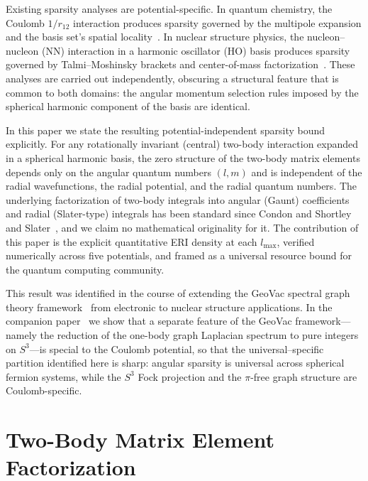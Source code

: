 \documentclass[twocolumn,pra,amsmath,amssymb,superscriptaddress]{revtex4-2}
\begin{document}
Existing sparsity analyses are potential-specific.  In quantum
chemistry, the Coulomb $1/r_{12}$ interaction produces sparsity
governed by the multipole expansion and the basis set's spatial
locality~\cite{Whitten1973, Dunlap2000}.  In nuclear structure
physics, the nucleon--nucleon (NN) interaction in a harmonic
oscillator (HO) basis produces sparsity governed by
Talmi--Moshinsky brackets and center-of-mass
factorization~\cite{Suhonen2007}.  These analyses are carried out
independently, obscuring a structural feature that is common to both
domains: the angular momentum selection rules imposed by the
spherical harmonic component of the basis are identical.

In this paper we state the resulting potential-independent sparsity
bound explicitly.  For any rotationally invariant (central) two-body
interaction expanded in a spherical harmonic basis, the zero
structure of the two-body matrix elements depends only on the
angular quantum numbers $(l, m)$ and is independent of the radial
wavefunctions, the radial potential, and the radial quantum numbers.
The underlying factorization of two-body integrals into angular
(Gaunt) coefficients and radial (Slater-type) integrals has been
standard since Condon and Shortley~\cite{CondonShortley1935} and
Slater~\cite{Slater1960}, and we claim no mathematical originality
for it.  The contribution of this paper is the explicit quantitative
ERI density at each $l_{\max}$, verified numerically across five
potentials, and framed as a universal resource bound for the quantum
computing community.

This result was identified in the course of extending the GeoVac
spectral graph theory framework~\cite{GeoVac_Paper7, GeoVac_Paper14}
from electronic to nuclear structure applications.  In the
companion paper~\cite{GeoVac_Paper23} we show that a separate
feature of the GeoVac framework---namely the reduction of the
one-body graph Laplacian spectrum to pure integers on $S^3$---is
special to the Coulomb potential, so that the universal--specific
partition identified here is sharp: angular sparsity is universal
across spherical fermion systems, while the $S^3$ Fock projection
and the $\pi$-free graph structure are Coulomb-specific.

\section{Two-Body Matrix Element Factorization}
\label{sec:factorization}
\end{document}
